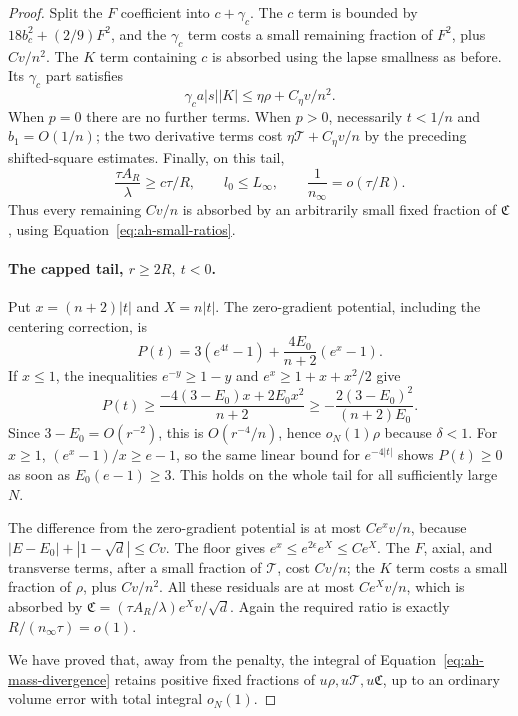 \begin{proof}
Split the \(F\) coefficient into \(c+\gamma_c\).
The \(c\) term is bounded by
\(18b_c^2+(2/9)F^2\), and the \(\gamma_c\) term costs a small
remaining fraction of \(F^2\), plus \(Cv/n^2\).
The \(K\) term containing \(c\) is absorbed using the lapse smallness
as before. Its \(\gamma_c\) part satisfies
\[
 \gamma_c a|s||K|\le\eta\rho+C_\eta v/n^2.
\]
When \(p=0\) there are no further terms. When \(p>0\), necessarily
\(t<1/n\) and \(b_1=O(1/n)\); the two derivative terms cost
\(\eta\mathcal T+C_\eta v/n\) by the preceding shifted-square estimates.
Finally, on this tail,
\[
 \frac{\tau A_R}{\lambda}\ge c\tau/R,\qquad
 l_0\le L_\infty,\qquad
 \frac1{n_\infty}=o(\tau/R).
\]
Thus every remaining \(Cv/n\) is absorbed by an arbitrarily small
fixed fraction of \(\mathfrak C\), using
Equation~\eqref{eq:ah-small-ratios}.

\paragraph{The capped tail, \(r\ge2R,\ t<0\).}
Put \(x=(n+2)|t|\) and \(X=n|t|\). The zero-gradient potential,
including the centering correction, is
\begin{equation}\label{eq:ah-negative-tail-potential}
 P(t)=3(e^{4t}-1)+\frac{4E_0}{n+2}(e^x-1).
\end{equation}
If \(x\le1\), the inequalities \(e^{-y}\ge1-y\) and
\(e^x\ge1+x+x^2/2\) give
\[
 P(t)\ge\frac{-4(3-E_0)x+2E_0x^2}{n+2}
       \ge-\frac{2(3-E_0)^2}{(n+2)E_0}.
\]
Since \(3-E_0=O(r^{-2})\), this is \(O(r^{-4}/n)\), hence
\(o_N(1)\rho\) because \(\delta<1\).
For \(x\ge1\),
\((e^x-1)/x\ge e-1\), so the same linear bound for \(e^{-4|t|}\)
shows \(P(t)\ge0\) as soon as \(E_0(e-1)\ge3\).
This holds on the whole tail for all sufficiently large \(N\).

The difference from the zero-gradient potential is at most
\(Ce^xv/n\), because
\(|E-E_0|+|1-\sqrt d|\le Cv\).
The floor gives \(e^x\le e^{2\epsilon}e^X\le Ce^X\).
The \(F\), axial, and transverse terms, after a small fraction of
\(\mathcal T\), cost \(Cv/n\); the \(K\) term costs a small
fraction of \(\rho\), plus \(Cv/n^2\).
All these residuals are at most \(Ce^Xv/n\), which is absorbed by
\(\mathfrak C=(\tau A_R/\lambda)e^Xv/\sqrt d\).
Again the required ratio is exactly \(R/(n_\infty\tau)=o(1)\).

We have proved that, away from the penalty, the integral of
Equation~\eqref{eq:ah-mass-divergence} retains positive fixed
fractions of \(u\rho,u\mathcal T,u\mathfrak C\), up to an ordinary
volume error with total integral \(o_N(1)\).


\end{proof}
